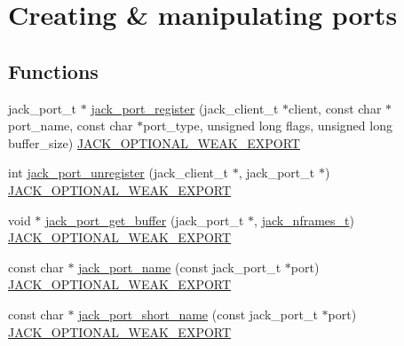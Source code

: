 \hypertarget{group__PortFunctions}{\section{\-Creating \& manipulating ports}
\label{de/d5e/group__PortFunctions}
}
\subsection*{\-Functions}
\begin{DoxyCompactItemize}
\item 
jack\-\_\-port\-\_\-t $\ast$ \hyperlink{group__PortFunctions_ga3e21d145c3c82d273a889272f0e405e7}{jack\-\_\-port\-\_\-register} (jack\-\_\-client\-\_\-t $\ast$client, const char $\ast$port\-\_\-name, const char $\ast$port\-\_\-type, unsigned long flags, unsigned long buffer\-\_\-size) \hyperlink{weakmacros_8h_adf1bde0dd996bbf61a44311165014dd1}{\-J\-A\-C\-K\-\_\-\-O\-P\-T\-I\-O\-N\-A\-L\-\_\-\-W\-E\-A\-K\-\_\-\-E\-X\-P\-O\-R\-T}
\item 
int \hyperlink{group__PortFunctions_ga9ac3ccd93be18999c0bd817bc032e876}{jack\-\_\-port\-\_\-unregister} (jack\-\_\-client\-\_\-t $\ast$, jack\-\_\-port\-\_\-t $\ast$) \hyperlink{weakmacros_8h_adf1bde0dd996bbf61a44311165014dd1}{\-J\-A\-C\-K\-\_\-\-O\-P\-T\-I\-O\-N\-A\-L\-\_\-\-W\-E\-A\-K\-\_\-\-E\-X\-P\-O\-R\-T}
\item 
void $\ast$ \hyperlink{group__PortFunctions_ga209880b64774dd039c703ea8e3b9ca63}{jack\-\_\-port\-\_\-get\-\_\-buffer} (jack\-\_\-port\-\_\-t $\ast$, \hyperlink{types_8h_aa954df532e901ae5172e68a23f3da9b6}{jack\-\_\-nframes\-\_\-t}) \hyperlink{weakmacros_8h_adf1bde0dd996bbf61a44311165014dd1}{\-J\-A\-C\-K\-\_\-\-O\-P\-T\-I\-O\-N\-A\-L\-\_\-\-W\-E\-A\-K\-\_\-\-E\-X\-P\-O\-R\-T}
\item 
const char $\ast$ \hyperlink{group__PortFunctions_ga2abf1e9c3fa7d2afae6fd85a6e2ba843}{jack\-\_\-port\-\_\-name} (const jack\-\_\-port\-\_\-t $\ast$port) \hyperlink{weakmacros_8h_adf1bde0dd996bbf61a44311165014dd1}{\-J\-A\-C\-K\-\_\-\-O\-P\-T\-I\-O\-N\-A\-L\-\_\-\-W\-E\-A\-K\-\_\-\-E\-X\-P\-O\-R\-T}
\item 
const char $\ast$ \hyperlink{group__PortFunctions_gaf1554d11abaff29321db1daf1fa614c1}{jack\-\_\-port\-\_\-short\-\_\-name} (const jack\-\_\-port\-\_\-t $\ast$port) \hyperlink{weakmacros_8h_adf1bde0dd996bbf61a44311165014dd1}{\-J\-A\-C\-K\-\_\-\-O\-P\-T\-I\-O\-N\-A\-L\-\_\-\-W\-E\-A\-K\-\_\-\-E\-X\-P\-O\-R\-T}
\item 

\end{DoxyCompactItemize}
